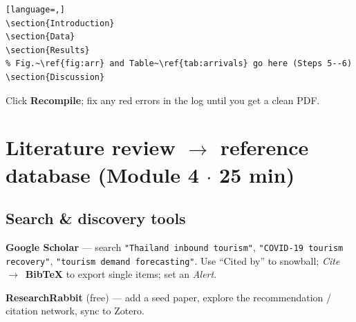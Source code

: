 \documentclass[11pt]{article}
\begin{document}
\begin{lstlisting}[language=,]
\section{Introduction}
\section{Data}
\section{Results}
% Fig.~\ref{fig:arr} and Table~\ref{tab:arrivals} go here (Steps 5--6)
\section{Discussion}
\end{lstlisting}

\begin{checklist}
\item Click \textbf{Recompile}; fix any red errors in the log until you get a clean PDF.
\end{checklist}

\section{Literature review $\rightarrow$ reference database \hfill {\normalfont\small (Module 4 $\cdot$ 25 min)}}

\subsection*{Search \& discovery tools}
\begin{checklist}
\item \textbf{Google Scholar} --- search \texttt{"Thailand inbound tourism"}, \texttt{"COVID-19 tourism recovery"}, \texttt{"tourism demand forecasting"}. Use ``Cited by'' to snowball; \emph{Cite}~$\rightarrow$~\textbf{BibTeX} to export single items; set an \emph{Alert}.
\item \textbf{ResearchRabbit} (free) --- add a seed paper, explore the recommendation / citation network, sync to Zotero.
\end{checklist}
\end{document}
